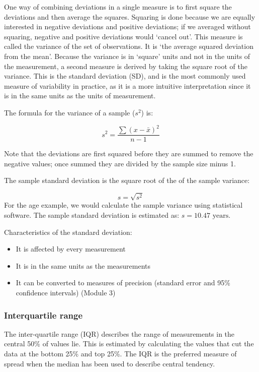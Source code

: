 \documentclass[
  a4paper,
]{memoir}
\providecommand{\tightlist}{%
  \setlength{\itemsep}{0pt}\setlength{\parskip}{0pt}}
\begin{document}
One way of combining deviations in a single measure is to first square
the deviations and then average the squares. Squaring is done because we
are equally interested in negative deviations and positive deviations;
if we averaged without squaring, negative and positive deviations would
`cancel out'. This measure is called the variance of the set of
observations. It is `the average squared deviation from the mean'.
Because the variance is in `square' units and not in the units of the
measurement, a second measure is derived by taking the square root of
the variance. This is the standard deviation (SD), and is the most
commonly used measure of variability in practice, as it is a more
intuitive interpretation since it is in the same units as the units of
measurement.

The formula for the variance of a sample (\(s^2\)) is:

\[ s^2 = \frac{\sum(x - \bar{x})^2}{n-1} \]

Note that the deviations are first squared before they are summed to
remove the negative values; once summed they are divided by the sample
size minus 1.

The sample standard deviation is the square root of the of the sample
variance:

\[s = \sqrt{s^2}\] For the age example, we would calculate the sample
variance using statistical software. The sample standard deviation is
estimated as: \(s = 10.47 \text{ years}\).

Characteristics of the standard deviation:

\begin{itemize}
\tightlist
\item
  It is affected by every measurement
\item
  It is in the same units as the measurements
\item
  It can be converted to measures of precision (standard error and 95\%
  confidence intervals) (Module 3)
\end{itemize}

\subsubsection{Interquartile range}\label{interquartile-range}

The inter-quartile range (IQR) describes the range of measurements in
the central 50\% of values lie. This is estimated by calculating the
values that cut the data at the bottom 25\% and top 25\%. The IQR is the
preferred measure of spread when the median has been used to describe
central tendency.
\end{document}
